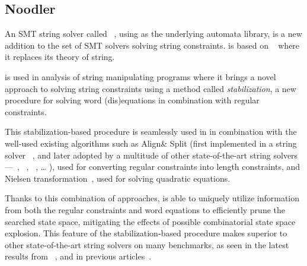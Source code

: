 \subsection{Noodler}

An SMT string solver called \noodler~\cite{fm23_equations_synergy_regular_constraints_DBLP:conf/fm/BlahoudekCCHHLS23, oopsla23_stabilization_DBLP:journals/pacmpl/ChenCHHLS23,tacas24_noodler_10.1007/978-3-031-57246-3_2}, using \mata as the underlying automata library, is a new addition to the set of SMT solvers solving string constraints.
\noodler is based on \ziii~\cite{z3} where it replaces its theory of string.

\noodler is used in analysis of string manipulating programs where it brings a novel approach to solving string constraints using a method called \emph{stabilization}, a new procedure for solving word (dis)equations in combination with regular constraints.

This stabilization-based procedure is seamlessly used in \noodler in combination with the well-used existing algorithms such as
Align\& Split (first implemented in a string solver \norn~\cite{Norn,AutomataSplitting}, and later adopted by a multitude of other state-of-the-art string solvers---\ostrich~\cite{AnthonyTowards2016,AnthonyReplaceAll2018,AnthonyComplex2019,AnthonyRegex2022,AnthonyInteger2020},
\ziiistriiire~\cite{Z3str3RE,BerzishDGKMMN23}, \sloth~\cite{holik_string_2018}, \ldots
), used for converting regular constraints into length constraints, and
Nielsen transformation~\cite{nielsen1917}, used for solving quadratic equations.

Thanks to this combination of approaches, \noodler is able to uniquely utilize information from both the regular constraints and word equations to efficiently prune the searched state space, mitigating the effects of possible combinatorial state space explosion.
This feature of the stabilization-based procedure makes \noodler superior to other state-of-the-art string solvers on many benchmarks, as seen in the latest results from \noodler~\cite{tacas24_noodler_10.1007/978-3-031-57246-3_2}, and in previous articles~\cite{fm23_equations_synergy_regular_constraints_DBLP:conf/fm/BlahoudekCCHHLS23, oopsla23_stabilization_DBLP:journals/pacmpl/ChenCHHLS23}.

